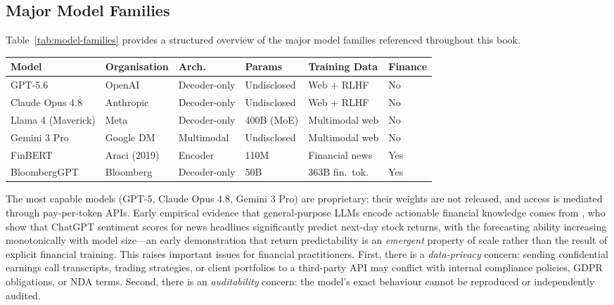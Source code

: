 \begin{context}
\subsection{Major Model Families}
\label{sec:landscape-families}

Table~\ref{tab:model-families} provides a structured overview of the major model
families referenced throughout this book.

\begin{center}
\footnotesize
\setlength{\tabcolsep}{4pt}
\begin{tabularx}{\linewidth}{>{\raggedright\arraybackslash}X l l l X l}
\hline
\textbf{Model} & \textbf{Organisation} & \textbf{Arch.} & \textbf{Params} &
\textbf{Training Data} & \textbf{Finance} \\
\hline
GPT-5.6          & OpenAI        & Decoder-only & Undisclosed      & Web + RLHF       & No  \\
Claude Opus 4.8  & Anthropic     & Decoder-only & Undisclosed      & Web + RLHF       & No  \\
Llama 4 (Maverick) & Meta        & Decoder-only & 400B (MoE)       & Multimodal web   & No  \\
Gemini 3 Pro     & Google DM     & Multimodal   & Undisclosed      & Multimodal web   & No  \\
FinBERT          & Araci (2019)  & Encoder      & 110M             & Financial news   & Yes \\
BloombergGPT     & Bloomberg     & Decoder-only & 50B              & 363B fin.\ tok.  & Yes \\
\hline
\end{tabularx}
\label{tab:model-families}
\end{center}

The most capable models (GPT-5, Claude Opus 4.8, Gemini 3 Pro) are proprietary: their
weights are not released, and access is mediated through pay-per-token APIs.
Early empirical evidence that general-purpose LLMs encode actionable financial
knowledge comes from \citet{LopezLiraTang2023}, who show that ChatGPT sentiment
scores for news headlines significantly predict next-day stock returns, with the
forecasting ability increasing monotonically with model size---an early demonstration
that return predictability is an \emph{emergent} property of scale rather than
the result of explicit financial training.
This raises important issues for financial practitioners.  First, there is a
\emph{data-privacy} concern: sending confidential earnings call transcripts, trading
strategies, or client portfolios to a third-party API may conflict with internal
compliance policies, GDPR obligations, or NDA terms.  Second, there is an
\emph{auditability} concern: the model's exact behaviour cannot be reproduced or
independently audited.


\end{context}
